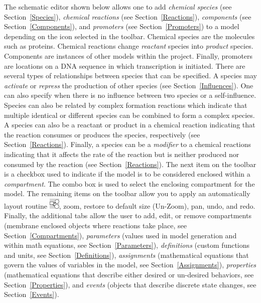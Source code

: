 \documentclass[titlepage,11pt]{article}
\begin{document}
\noindent
The schematic editor shown below allows one to add \emph{chemical species} (see Section~\ref{Species}), 
\emph{chemical reactions} (see Section~\ref{Reactions}), \emph{components} (see Section~\ref{Components}),
and \emph{promoters} (see Section~\ref{Promoters}) to a model depending on the icon selected in the toolbar.   Chemical species are the molecules such as proteins.  Chemical reactions change \emph{reactant} species into \emph{product} species.  Components are instances of other models within the project.  Finally, promoters are locations on a DNA sequence in which transcription is initiated.  
% 
There are several types of relationships between species that can be specified.  A species may \emph{activate} or \emph{repress} the production of other species (see Section~\ref{Influences}).  One can also specify when there is no influence between two species or a self-influence.  Species can also be related by complex formation reactions  which indicate that multiple identical or different species can be combined to form a complex species.  A species can also be a reactant or product in a chemical reaction indicating that the reaction consumes or produces the species, respectively (see Section~\ref{Reactions}).  Finally, a species can be a \emph{modifier} to a chemical reactions indicating that it affects the rate of the reaction but is neither produced nor consumed by the reaction (see Section~\ref{Reactions}).
%
The next item on the toolbar is a checkbox used to indicate if the model is to be considered enclosed within a \emph{compartment}.  The combo box is used to select the enclosing compartment for the model.  The remaining items on the toolbar allow you to apply an automatically layout routine \includegraphics{../gui/icons/modelview/choose_layout_selected}, zoom, restore to default size (Un-Zoom), pan, undo, and redo.
% 
Finally, the additional tabs allow the user to add, edit, or remove compartments (membrane enclosed objects where reactions take place, see Section~\ref{Compartments}), \emph{parameters} (values used in model generation and within math equations, see Section~\ref{Parameters}), \emph{definitions} (custom functions and units, see Section~\ref{Definitions}), \emph{assignments} (mathematical equations that govern the values of variables in the model, see Section~\ref{Assignments}), \emph{properties} (mathematical equations that describe either desired or un-desired behaviors, see Section~\ref{Properties}), and \emph{events} (objects that describe discrete state changes, see Section~\ref{Events}).
\end{document}
